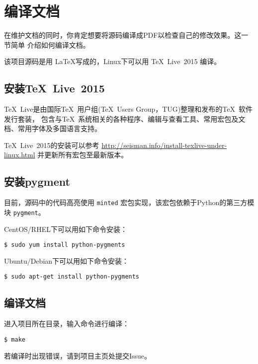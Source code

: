 \section{编译文档}
在维护文档的同时，你肯定想要将源码编译成PDF以检查自己的修改效果。这一节简单
介绍如何编译文档。

该项目源码是用 \LaTeX 写成的，Linux下可以用 \TeX~Live~2015 编译。

\subsection{安装\TeX~Live~2015}
\TeX~Live是由国际\TeX~用户组(\TeX~Users Group，TUG)整理和发布的\TeX~软件发行套装，
包含与\TeX~系统相关的各种程序、编辑与查看工具、常用宏包及文档、常用字体及多国语言支持。

\TeX~Live~2015的安装可以参考 \url{http://seisman.info/install-texlive-under-linux.html}
并更新所有宏包至最新版本。

\subsection{安装pygment}
目前，源码中的代码高亮使用 \texttt{minted} 宏包实现，该宏包依赖于Python的第三方模块 \texttt{pygment}。

CentOS/RHEL下可以用如下命令安装：
\begin{verbatim}
$ sudo yum install python-pygments
\end{verbatim}

Ubuntu/Debian下可以用如下命令安装：
\begin{verbatim}
$ sudo apt-get install python-pygments
\end{verbatim}

\subsection{编译文档}
进入项目所在目录，输入命令进行编译：
\begin{verbatim}
$ make
\end{verbatim}
若编译时出现错误，请到项目主页处提交Issue。